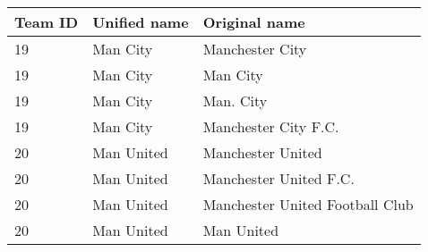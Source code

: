 \begin{tabular}{lll}
\multicolumn{1}{l}{Team ID} &  Unified name & Original name   \\
\midrule
19 & Man City & Manchester City \\
19 & Man City & Man City \\
19 & Man City & Man. City \\
19 & Man City & Manchester City F.C. \\
20 & Man United & Manchester United \\
20 & Man United & Manchester United F.C.  \\
20 & Man United & Manchester United Football Club  \\
20 & Man United & Man United  \\
\bottomrule
\end{tabular}%
